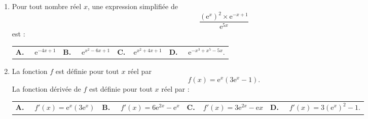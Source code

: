 \documentclass[10pt]{article}
\providecommand{\e}{{\mathrm{e}}}
\begin{document}
\begin{enumerate}
\medskip

\item Pour tout nombre réel $x$, une expression simplifiée de \[\dfrac{(\e^x)^2\times \e^{-x+1}}{\e^{5x}}\] est :

\medskip

\begin{tabularx}{\linewidth}{*{4}{X}}
\textbf{A.~~} $\e^{-4x+1} $ &\textbf{B.~~} $\e^{x^2-6x+1} $&\textbf{C.~~}$ \e^{x^2+4x+1}$& \textbf{D.~~} $\e^{-x^3+x^5-5x}  $.
\end{tabularx}

\medskip

\item La fonction $f$ est définie pour tout $x$ réel par \[f(x)=\e^x(3\e^x-1).\]
La fonction dérivée de $f$ est définie pour tout $x$ réel par :

\medskip

\begin{tabularx}{\linewidth}{*{4}{X}}
\textbf{A.~~} $f'(x)=\e^x(3\e^x) $ &\textbf{B.~~} $f'(x)=6\e^{2x}-\e^x $&\textbf{C.~~}$f'(x)=3\e^{2x}-\e{x}$& \textbf{D.~~} $f'(x)=3(\e^x)^2-1  $.
\end{tabularx}
\end{enumerate}

\vspace{0,5cm}
\end{document}
